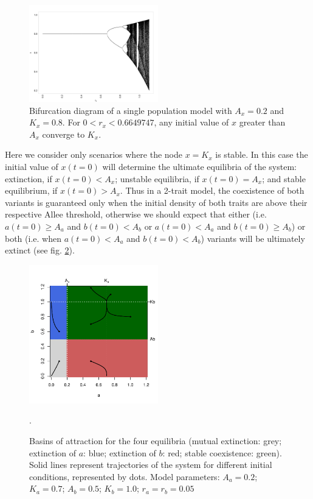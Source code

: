 \documentclass[3p,authoryear,twocolumn]{elsarticle} %
\begin{document}
\begin{figure}[h!]
  \centering
      \includegraphics[width=0.5\textwidth]{./figures/figure1.jpg}
  \caption{Bifurcation diagram of a single population model with $A_x=0.2$ and $K_x=0.8$. For $0<r_x<0.6649747$, any initial value of $x$ greater than $A_x$ converge to $K_x$.}
    \label{fig:bifurcationDiagram}
\end{figure}

Here we consider only scenarios where the node $x=K_x$ is stable. In this case the initial value of $x(t=0)$ will determine the ultimate equilibria of the system: extinction, if $x(t=0)<A_x$; unstable equilibria, if $x(t=0)=A_x$; and stable equilibrium, if $x(t=0)>A_x$. Thus in a 2-trait model, the coexistence of both variants is guaranteed only when the initial density of both traits are above their respective Allee threshold, otherwise we should expect that either (i.e. $a(t=0) \geq A_a$ and $b(t=0)<A_b$ or $a(t=0)<A_a$ and $b(t=0) \geq A_b$) or both (i.e. when $a(t=0)<A_a$ and $b(t=0)<A_b$) variants will be ultimately extinct (see fig. \ref{fig:NoTransmissionBasin}). 

\begin{figure}[h!]
  \centering
      \includegraphics[width=0.5\textwidth]{./figures/figure2.pdf}
  \caption{Basins of attraction for the four equilibria (mutual extinction: grey; extinction of $a$: blue; extinction of $b$: red; stable coexistence: green). Solid lines represent trajectories of the system for different initial conditions, represented by dots. Model parameters: $A_a=0.2$; $K_a=0.7$; $A_b=0.5$; $K_b=1.0$; $r_a=r_b=0.05$}.
    \label{fig:NoTransmissionBasin}
\end{figure}
\end{document}
